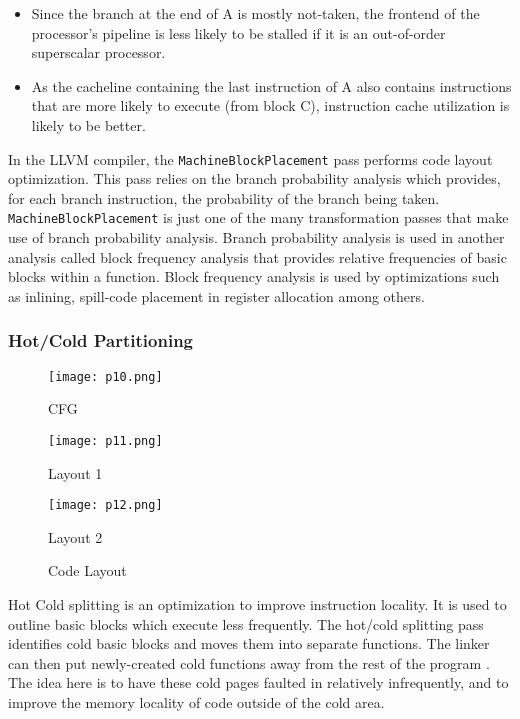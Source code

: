 \begin{itemize}
\item Since the branch at the end of A is mostly not-taken,
the frontend of the processor's pipeline is less likely to
be stalled if it is an out-of-order superscalar processor.
\item As the cacheline containing the last instruction of A
also contains instructions that are more likely to execute (from block C), instruction cache utilization is
likely to be better.
\end{itemize}

In the LLVM compiler, the \texttt{MachineBlockPlacement} pass
performs code layout optimization. This pass relies on the
branch probability analysis which provides, for each branch
instruction, the probability of the branch being taken.
\texttt{MachineBlockPlacement} is just one of the many transformation passes that make use of branch probability analysis.
Branch probability analysis is used in another analysis called
block frequency analysis that provides relative frequencies of
basic blocks within a function. Block frequency analysis is
used by optimizations such as inlining, spill-code placement 
in register allocation among others.

\subsubsection{Hot/Cold Partitioning}

\begin{figure}[!htb]
      \texttt{[image: p10.png]}
      \caption{CFG}\label{fig:p10}
    \endminipage\hfill
      \texttt{[image: p11.png]}
      \caption{Layout 1}\label{fig:p11}
    \endminipage\hfill
      \texttt{[image: p12.png]}
      \caption{Layout 2}\label{fig:p12}
    \endminipage\hfill
    \caption{Code Layout}
\end{figure}


Hot Cold splitting is an optimization to improve instruction locality. It is used to outline basic blocks which execute less frequently. The hot/cold splitting pass identifies cold basic blocks and moves them into separate functions. The linker can then put newly-created cold functions away from the rest of the program . The idea here is to have these cold pages faulted in relatively infrequently, and to improve the memory locality of code outside of the cold area.

